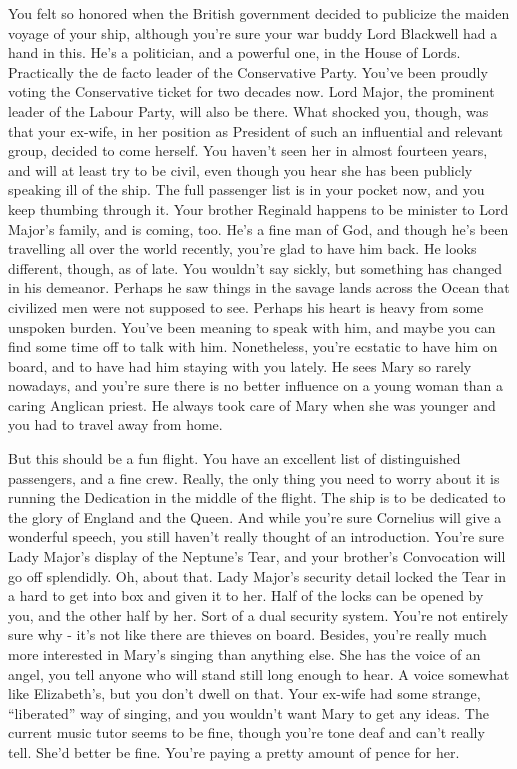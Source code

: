 \documentclass[char]{airship}
\begin{document}
You felt so honored when the British government decided to publicize
the maiden voyage of your ship, although you're sure your war buddy
Lord Blackwell had a hand in this. He's a politician, and a powerful
one, in the House of Lords. Practically the de facto leader of the
Conservative Party. You've been proudly voting the Conservative ticket
for two decades now. Lord Major, the prominent leader of the Labour
Party, will also be there. What shocked you, though, was that your
ex-wife, in her position as President of such an influential and
relevant group, decided to come herself. You haven't seen her in
almost fourteen years, and will at least try to be civil, even though
you hear she has been publicly speaking ill of the ship. The full
passenger list is in your pocket now, and you keep thumbing through
it. Your brother Reginald happens to be minister to Lord Major's
family, and is coming, too. He's a fine man of God, and though he's
been travelling all over the world recently, you're glad to have him
back. He looks different, though, as of late.  You wouldn't say
sickly, but something has changed in his demeanor. Perhaps he saw
things in the savage lands across the Ocean that civilized men were
not supposed to see. Perhaps his heart is heavy from some unspoken
burden. You've been meaning to speak with him, and maybe you can find
some time off to talk with him. Nonetheless, you're ecstatic to have
him on board, and to have had him staying with you lately. He sees
Mary so rarely nowadays, and you're sure there is no better influence
on a young woman than a caring Anglican priest. He always took care of
Mary when she was younger and you had to travel away from home.

But this should be a fun flight. You have an excellent list of
distinguished passengers, and a fine crew. Really, the only thing you
need to worry about it is running the Dedication in the middle of
the flight. The ship is to be dedicated to the glory of England and the Queen.
And while you're sure Cornelius will give a wonderful
speech, you still haven't really thought of an introduction. You're
sure Lady Major's display of the Neptune's Tear, and your brother's
Convocation will go off splendidly. Oh, about that. Lady Major's security detail locked the Tear in a hard to get into box and given it to her. Half of the locks can be opened by you, and the other half by her. Sort of a dual security system. You're not entirely sure why - it's not like there are thieves on board. Besides, you're really much more
interested in Mary's singing than anything else. She has the voice of
an angel, you tell anyone who will stand still long enough to hear. A
voice somewhat like Elizabeth's, but you don't dwell on that.  Your
ex-wife had some strange, ``liberated'' way of singing, and you
wouldn't want Mary to get any ideas. The current music tutor seems to
be fine, though you're tone deaf and can't really tell. She'd better
be fine. You're paying a pretty amount of pence for her.
\end{document}
